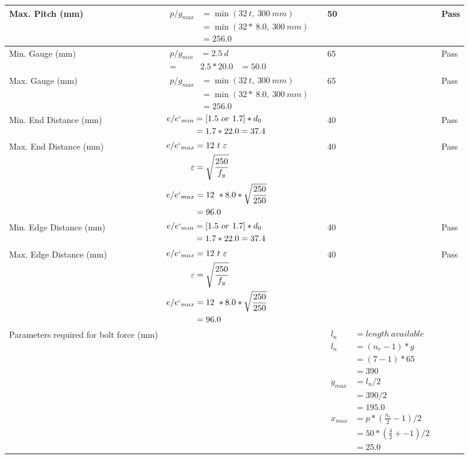 \documentclass{article}%
\begin{document}
\begin{longtable}{|p{4cm}|p{5cm}|p{5.5cm}|p{1.5cm}|}
Max. Pitch (mm)&$\begin{aligned}p/g_{max} &=\min(32~t,~300~mm)&\\ &=\min(32 *~8.0,~ 300 ~mm)\\&=256.0\end{aligned}$&50&Pass\\%
\hline%
Min. Gauge (mm)&$\begin{aligned}p/g_{min}&= 2.5 ~ d&\\ =&2.5*20.0&=50.0\end{aligned}$&65&Pass\\%
\hline%
Max. Gauge (mm)&$\begin{aligned}p/g_{max} &=\min(32~t,~300~mm)&\\ &=\min(32 *~8.0,~ 300 ~mm)\\&=256.0\end{aligned}$&65&Pass\\%
\hline%
Min. End Distance (mm)&$\begin{aligned}e/e`_{min} &=[1.5~or~ 1.7] * d_0\\ &=1.7*22.0=37.4 \end{aligned}$&40&Pass\\%
\hline%
Max. End Distance (mm)&$\begin{aligned}e/e`_{max} &= 12~ t~ \varepsilon&\\ \varepsilon &= \sqrt{\frac{250}{f_y}}\\ e/e`_{max}&=12 ~*8.0*\sqrt{\frac{250}{250}}\\ &=96.0\\ \end{aligned}$&40&Pass\\%
\hline%
Min. Edge Distance (mm)&$\begin{aligned}e/e`_{min} &=[1.5~or~ 1.7] * d_0\\ &=1.7*22.0=37.4 \end{aligned}$&40&Pass\\%
\hline%
Max. Edge Distance (mm)&$\begin{aligned}e/e`_{max} &= 12~ t~ \varepsilon&\\ \varepsilon &= \sqrt{\frac{250}{f_y}}\\ e/e`_{max}&=12 ~*8.0*\sqrt{\frac{250}{250}}\\ &=96.0\\ \end{aligned}$&40&Pass\\%
\hline%
Parameters required for bolt force (mm)&&$\begin{aligned} l_n~~~ &= length~available \\  l_n~~~ &= (n_r - 1) * g\\  &= (7 - 1) *65\\  & =390\\  y_{max} &= l_n / 2\\  &= 390 / 2 \\  & =195.0\\ x_{max} &= p * (\frac{n_c}{2} - 1) / 2 \\  &= 50 * (\frac{4}{2} + - 1) / 2 \\  & =25.0\end{aligned}$&\\%

\end{longtable}
\end{document}
